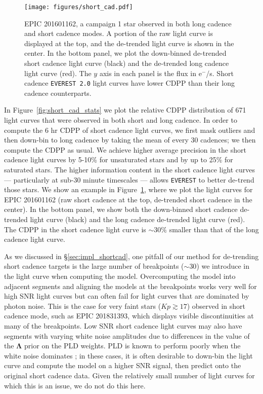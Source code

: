 \documentclass[]{emulateapj}
\newcommand{\Kp}{\ensuremath{Kp}}
\begin{document}
\begin{figure}[hbt]
  \begin{center}
      \texttt{[image: figures/short\_cad.pdf]}
       \caption{EPIC 201601162, a campaign 1 star observed in both long cadence and
       short cadence modes. A portion of the raw light curve is
       displayed at the top, and the de-trended light curve is shown in the center. In the bottom panel,
       we plot the down-binned de-trended short cadence light curve (black) and the
       de-trended long cadence light curve (red). The $y$ axis in each panel is the flux
       in e$^{-}$/s.
       Short cadence \texttt{EVEREST 2.0}
       light curves have lower CDPP than their long cadence counterparts.}
     \label{fig:short_cad}
  \end{center}
\end{figure}

In Figure~\ref{fig:short_cad_stats} we plot the relative CDPP distribution of
671 light curves that were observed in both short and long cadence. In order to
compute the 6 hr CDPP of short cadence light curves, we first mask outliers and then
down-bin to long cadence by taking the mean of every 30 cadences; we then compute
the CDPP as usual. We achieve higher average precision in the short cadence light
curves by 5-10\% for unsaturated stars and by up to 25\% for saturated stars. The
higher information content in the short cadence light curves --- particularly
at sub-30 minute timescales --- allows \texttt{EVEREST} to better de-trend those stars.
We show an example in Figure~\ref{fig:short_cad}, where we plot the light curves
for EPIC 201601162 (raw short cadence at the top, de-trended short cadence in the
center). In the bottom panel, we show both the down-binned short cadence de-trended light
curve (black) and the long cadence de-trended light curve (red). The CDPP in the short
cadence light curve is ${\sim}30\%$ smaller than that of the long cadence light curve.

As we discussed in \S\ref{sec:impl_shortcad}, one pitfall of our method for de-trending
short cadence targets is the large number of breakpoints (${\sim}30$) we introduce
in the light curve when computing the model. Overcomputing the model into adjacent
segments and aligning the models at the breakpoints works very well for high
SNR light curves but can often fail for light curves that are dominated by photon
noise. This is the case for very faint stars ($\Kp \gtrsim 17$) observed in
short cadence mode, such as EPIC 201831393, which displays visible discontinuities
at many of the breakpoints. Low SNR short cadence light curves may also have segments
with varying white noise amplitudes due to differences in the value of the $\mathbf{\Lambda}$
prior on the PLD weights. PLD is known to perform poorly when the white noise dominates
\citep{Deming15}; in these cases, it is often desirable to down-bin the light curve and
compute the model on a higher SNR signal, then predict onto the original short cadence
data. Given the relatively small number of light curves for which this is an issue,
we do not do this here.
\end{document}
